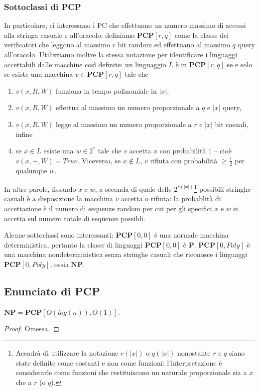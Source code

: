 \subsubsection{Sottoclassi di PCP}
In particolare, ci interessano i PC che effettuano un numero massimo di
accessi alla stringa casuale e all'oracolo: definiamo
$\mathbf{PCP}[r,q]$ come la classe dei verificatori che leggono al massimo $r$ bit random
ed effettuano al massimo $q$ query all'oracolo. Utilizziamo inoltre la stessa
notazione per identificare i linguaggi accettabili dalle macchine così definite:
un linguaggio $L$ è  in $\mathbf{PCP}[r,q]$ se e solo se esiste una macchina
$v \in \mathbf{PCP}[r,q]$ tale che
\begin{enumerate}
	\item $v(x,R,W)$ funziona in tempo polinomiale in $|x|$,
	\item $v(x,R,W)$ effettua al massimo un numero proporzionale
	      a $q$ e $|x|$ query,
	\item $v(x,R,W)$ legge al massimo un numero proporzionale a
	      $r$ e $|x|$ bit casuali, infine
	\item se $x \in L$ esiste una $w \in 2^*$ tale che $v$ accetta $x$ con probabilità
	      $1$ -- cioè $v(x, -, W) = True$. Viceversa, se $x \notin L$, $v$ rifiuta
	      con probabilità $\geq \frac{1}{2}$ per qualunque $w$.
\end{enumerate}
In altre parole, fissando $x$ e $w$, a seconda di quale delle $2^{r(|x|)}$\footnote{Accadrà
	di utilizzare la notazione $r(|x|)$ o $q(|x|)$ nonostante $r$ e $q$ siano
	state definite come costanti e non come funzioni: l'interpretazione è considerarle come
	funzioni che restituiscono un naturale proporzionale sia a $x$ che a $r$  (o $q$).}
possibili stringhe casuali è a disposizione la macchina $v$ accetta o rifiuta:
la probablità di accettazione è il numero di sequenze random per cui per gli specifici
$x$ e $w$ si accetta sul numero totale di sequenze possibli.

Alcune sottoclassi sono interessanti: $\mathbf{PCP}[0,0]$ è una normale macchina deterministica,
pertanto la classe di linguaggi $\textbf{PCP}[0,0]$ è $\textbf{P}$.
$\textbf{PCP}[0, Poly]$ è una macchina nondeterministica senza stringhe casuali che riconosce
i linguaggi $\textbf{PCP}[0, Poly]$, ossia $\textbf{NP}$.

\subsection{Enunciato di PCP}
\begin{theorem}\label{thm:pcp}
	$\textbf{NP} = \textbf{PCP}[O(log(n)), O(1)]$.
\end{theorem}
\begin{proof}
	Omessa.
\end{proof}


